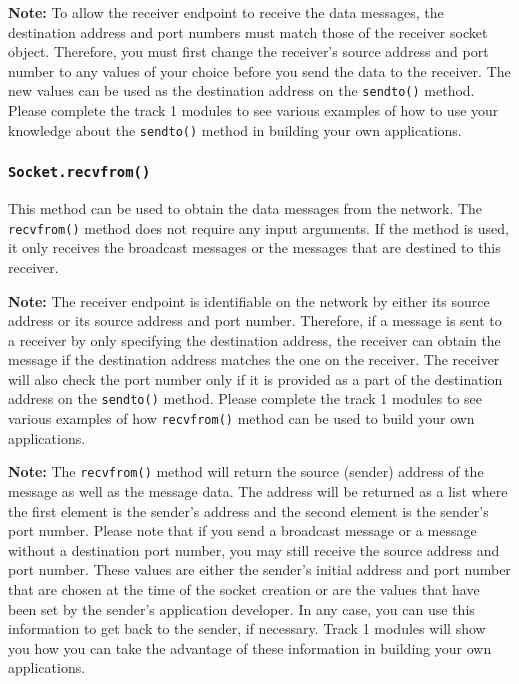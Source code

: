 \documentclass[11pt]{article}
\begin{document}
\textbf{Note:}
To allow the receiver endpoint to receive the data messages, the destination address and port numbers must match those of the receiver socket object.
Therefore, you must first change the receiver's source address and port number to any values of your choice before you send the data to the receiver.
The new values can be used as the destination address on the \texttt{sendto()} method.
Please complete the track 1 modules to see various examples of how to use your knowledge about the \texttt{sendto()} method in building your own applications.

\subsubsection{\texttt{Socket.\textbf{recvfrom()}}}
This method can be used to obtain the data messages from the network. The \texttt{recvfrom()} method does not require any input arguments. If the method is used, it only receives the broadcast messages or the messages that are destined to this receiver.

\textbf{Note:}
The receiver endpoint is identifiable on the network by either its source address or its source address and port number.
Therefore, if a message is sent to a receiver by only specifying the destination address, the receiver can obtain the message if the destination address matches the one on the receiver. The receiver will also check the port number only if it is provided as a part of the destination address on the \texttt{sendto()} method. Please complete the track 1 modules to see various examples of how \texttt{recvfrom()} method can be used to build your own applications.

\textbf{Note:}
The \texttt{recvfrom()} method will return the source (sender) address of the message as well as the message data.
The address will be returned as a list where the first element is the sender's address and the second element is the sender's port number.
Please note that if you send a broadcast message or a message without a destination port number, you may still receive the source address and port number.
These values are either the sender's initial address and port number that are chosen at the time of the socket creation or are the values that have been set by the sender's application developer. In any case, you can use this information to get back to the sender, if necessary. Track 1 modules will show you how you can take the advantage of these information in building your own applications.
\end{document}
